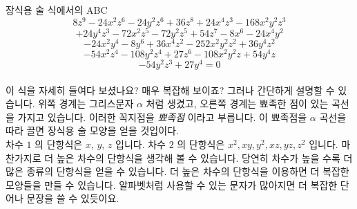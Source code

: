 ﻿\begin{surferPage}{장식용 술}
식에서의 ABC
  \smallskip
\[8z^9-24x^2z^6-24y^2z^6+36z^8+24x^4z^3-168x^2y^2z^3\]
\[+24y^4z^3-72x^2z^5-72y^2z^5+54z^7-8x^6-24x^4y^2\]
\[-24x^2y^4-8y^6 + 36x^4z^2-252x^2y^2z^2+36y^4z^2\]
\[- 54x^2z^4-108y^2z^4 + 27z^6-108x^2y^2z + 54y^4z\]
\[-54y^2z^3 + 27y^4 = 0\]\\
\vspace{0.3cm}
이 식을 자세히 들여다 보셨나요? 매우 복잡해 보이죠? 그러나 간단하게 설명할 수 있습니다. 위쪽 경계는 그리스문자 $\alpha$ 처럼 생겼고, 오른쪽 경계는 뾰족한 점이 있는 곡선을 가지고 있습니다. 이러한 꼭지점을 {\it 뾰족점} 이라고 부릅니다. 이 뾰족점을 $\alpha$ 곡선을 따라 끌면 장식용 술 모양을 얻을 것입이다. \\
\vspace{0.3cm}
차수 $1$ 의 단항식은 $x$, $y$, $z$ 입니다. 차수 $2$ 의 단항식은 $x^2, xy, y^2, xz, yz, z^2$ 입니다. 마찬가지로 더 높은 차수의 단항식을 생각해 볼 수 있습니다. 당연히 차수가 높을 수록 더 많은 종류의 단항식을 얻을 수 있습니다. 더 높은 차수의 단항식을 이용하면 더 복잡한 모양들을 만들 수 있습니다. 알파벳처럼 사용할 수 있는 문자가 많아지면 더 복잡한 단어나 문장을 쓸 수 있듯이요.
\end{surferPage}
